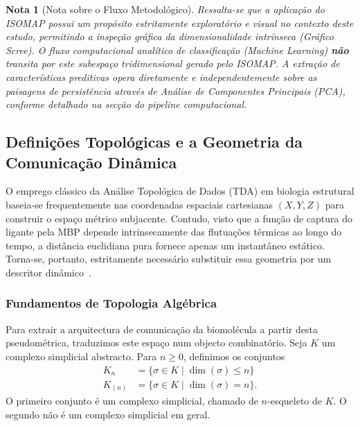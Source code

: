 \documentclass[12pt, a4paper]{article}
\newtheorem*{remark}{Nota}
\begin{document}
\begin{remark}[Nota sobre o Fluxo Metodológico]
Ressalta-se que a aplicação do ISOMAP possui um propósito estritamente exploratório e visual no contexto deste estudo, permitindo a inspeção gráfica da dimensionalidade intrínseca (Gráfico Scree). O fluxo computacional analítico de classificação (\textit{Machine Learning}) \textbf{não} transita por este subespaço tridimensional gerado pelo ISOMAP. A extração de características preditivas opera diretamente e independentemente sobre as paisagens de persistência através de Análise de Componentes Principais (PCA), conforme detalhado na secção do pipeline computacional.
\end{remark}

\subsection{Definições Topológicas e a Geometria da Comunicação Dinâmica}
\label{sec:topologia_dinamica}

O emprego clássico da Análise Topológica de Dados (TDA) em biologia estrutural baseia-se frequentemente nas coordenadas espaciais cartesianas $(X, Y, Z)$ para construir o espaço métrico subjacente. Contudo, visto que a função de captura do ligante pela MBP depende intrinsecamente das flutuações térmicas ao longo do tempo, a distância euclidiana pura fornece apenas um instantâneo estático. Torna-se, portanto, estritamente necessário substituir essa geometria por um descritor dinâmico~\cite{kovacev2016}.

\subsubsection{Fundamentos de Topologia Algébrica}

Para extrair a arquitectura de comunicação da biomolécula a partir desta pseudométrica, traduzimos este espaço num objecto combinatório. Seja $K$ um complexo simplicial abstracto. Para $n \geq 0$, definimos os conjuntos
\begin{align*}
    K_n &= \{\sigma \in K \mid \dim(\sigma) \leq n\}\\
    K_{(n)} &= \{\sigma \in K \mid \dim(\sigma) = n\}. 
\end{align*}
O primeiro conjunto é um complexo simplicial, chamado de $n$-esqueleto de $K$. O segundo não é um complexo simplicial em geral.
\end{document}
